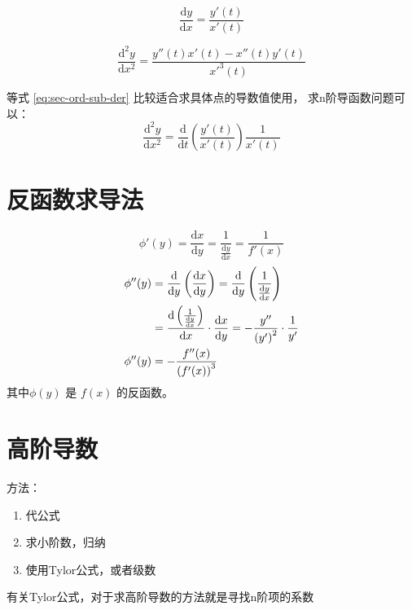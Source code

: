\begin{lemma}
    \begin{equation}
        \dfrac{\mathrm{d}y}{\mathrm{d}x} = \dfrac{y'(t)}{x'(t)}
    \end{equation}

    \begin{equation}\label{eq:sec-ord-sub-der}
        \dfrac{\mathrm{d}^2 y}{\mathrm{d}x^2} = \dfrac{y''(t) x'(t) -x''(t) y'(t)}{x'^3(t)}
    \end{equation}

    等式 \ref{eq:sec-ord-sub-der} 比较适合求具体点的导数值使用，
    求n阶导函数问题可以：
    \begin{equation}
        \dfrac{\mathrm{d}^2y}{\mathrm{d}x^2} = 
        \dfrac{\mathrm{d}}{\mathrm{d}t} 
        \left(
            \dfrac{y'(t)}{x'(t)} 
        \right)
        \dfrac{1}{x'(t)}
    \end{equation}
\end{lemma}

\section{反函数求导法}

\begin{corollary}
    \begin{equation}
        \phi' (y) = \frac{\mathrm{d}x}{\mathrm{d}y} = \frac{1}{\frac{\mathrm{d}y}{\mathrm{d}x}}
                  = \frac{1}{f'(x)}
    \end{equation}
    \begin{align}
        \notag \phi''(y) &= \frac{\mathrm d}{\mathrm dy}\left(\frac{\mathrm dx}{\mathrm dy}\right) = \frac{\mathrm d}{\mathrm dy} \left(\frac{1}{\frac{\mathrm dy}{\mathrm dx}}\right) \\
        \notag           &= \frac{\mathrm d\left(\frac{1}{\frac{\mathrm dy}{\mathrm dx}}\right)}{\mathrm dx} \cdot \frac{\mathrm dx}{\mathrm dy} = -\frac{y''}{\left(y'\right)^2} \cdot \frac{1}{y'}\\
        \phi''(y) &= - \frac{f''(x)}{\left(f'(x)\right)^3}
    \end{align}
    其中$\phi(y)$ 是 $f(x)$ 的反函数。
\end{corollary}

\section{高阶导数}

方法：
\begin{enumerate}
    \item 代公式
    \item 求小阶数，归纳
    \item 使用Tylor公式，或者级数
\end{enumerate}
有关Tylor公式，对于求高阶导数的方法就是寻找n阶项的系数

